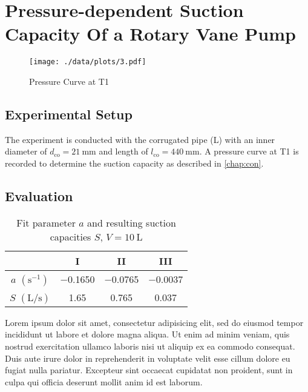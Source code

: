 \chapter{Pressure-dependent Suction Capacity Of a Rotary Vane Pump}
\begin{figure}[hbp]
	\centering
	\texttt{[image: ./data/plots/3.pdf]}
	\caption[Pressure Over Time]{Pressure Curve at T1}
	\label{fig:pressure_shit2}
\end{figure}

\section{Experimental Setup}
The experiment is conducted with the corrugated pipe (L) with an inner diameter of $d_\text{co}=\SI{21}{\milli\meter}$ and length of $l_\text{co}=\SI{440}{\milli\meter}$.
A pressure curve at T1 is recorded to determine the suction capacity as described in \autoref{chap:con}.

\section{Evaluation}
\begin{table}[b!]
	\centering
	\label{tab:values_suc}
	\caption[Fit parameters and suction capacities]{Fit parameter $a$ and resulting suction capacities $S$, $V=\SI{10}{\liter}$}
	\begin{tabular}{S|SSS}
		\toprule
		{}	&	{I}	&	{II}	&	{III}\\
		\midrule
		{$a$ $(\si{\second}^{-1})$}	&	\num{-0.1650}	&	\num{-0.0765}	&	\num{-0.0037}	\\
		{$S$ $(\si{\liter\per\second})$}	&	\num{1.65}	&	\num{0.765}	&	\num{0.037}	\\
		\bottomrule
	\end{tabular}
\end{table}
Lorem ipsum dolor sit amet, consectetur adipisicing elit, sed do eiusmod tempor incididunt ut labore et dolore magna aliqua. Ut enim ad minim veniam, quis nostrud exercitation ullamco laboris nisi ut aliquip ex ea commodo consequat. Duis aute irure dolor in reprehenderit in voluptate velit esse cillum dolore eu fugiat nulla pariatur. Excepteur sint occaecat cupidatat non proident, sunt in culpa qui officia deserunt mollit anim id est laborum.
